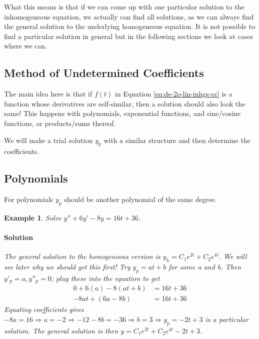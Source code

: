 \documentclass[letterpaper, 11pt, openany]{book}
\theoremstyle{mytheoremstyle}
\theoremstyle{myexamplestyle}
\newtheorem{example}{Example}[section]
\newenvironment{solution}{\paragraph{\sffamily \smaller \fontseries{b}\selectfont Solution}}{\hfill\faSquare}
\begin{document}
What this means is that if we can come up with one particular solution to the inhomogeneous equation, we actually can find all solutions, as we can always find the general solution to the underlying homogeneous equation. It is not possible to find a particular solution in general but in the following sections we look at cases where we can.

\subsection{Method of Undetermined Coefficients}

The main idea here is that if \(f(t)\) in Equation \eqref{eq:de-2o-lin-inhgs-cc} is a function whose derivatives are self-similar, then a solution should also look the same! This happens with polynomials, exponential functions, and sine/cosine functions, or products/sums thereof.

We will make a trial solution \(y_{p}\) with a similar structure and then determine the coefficients.

\subsection{Polynomials}

For polynomials \(y_{p}\) should be another polynomial of the same degree.

\begin{example}
    Solve \(y'' + 6y' -8y = 16t + 36\).
    \begin{solution}
        The general solution to the homogeneous version is \(y_{h} = C_{1} e^{2t} + C_{2} e^{4t}\). We will see later why we should get this first! Try \(y_{p} = at + b\) for some a and b. Then \(y'_{p} = a, y''_{p} = 0\); plug these into the equation to get 
        \begin{align*}
            0 + 6(a) - 8(at + b) &= 16t + 36\\
            -8at + (6a - 8b) &= 16t + 36
        \end{align*}
        Equating coefficients gives \(-8a = 16 \Rightarrow a = -2 \Rightarrow -12 - 8b = -36 \Rightarrow b = 3 \Rightarrow y_{p} = -2t + 3\) is a particular solution. The general solution is then \(y = C_{1} e^{2t} + C_{2} e^{4t} -2t + 3\).
    \end{solution}
\end{example}
\end{document}
